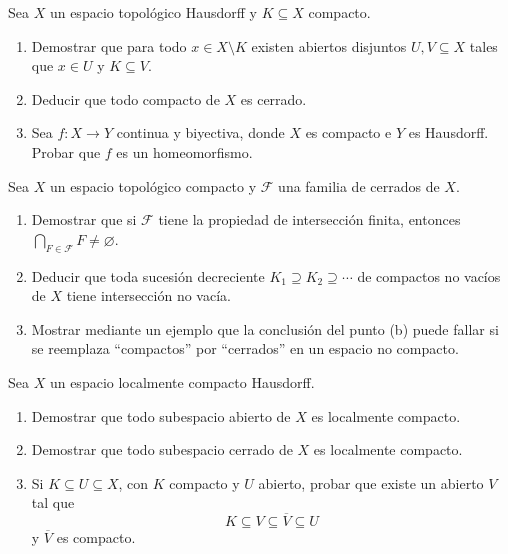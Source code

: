 \documentclass{article}
\theoremstyle{definition}
\newcommand{\cl}[1]{\overline{#1}}              %
\newenvironment{ejercicio}[1]{\begin{trivlist}
\item[\hskip \labelsep {\bfseries Ejercicio}\hskip \labelsep {\bfseries #1.}]}{\end{trivlist}}
\begin{document}
\begin{ejercicio}{15}
    Sea \(X\) un espacio topológico Hausdorff y \(K \subseteq X\) compacto.
    \begin{enumerate}
        \item Demostrar que para todo \(x \in X \setminus K\) existen abiertos disjuntos \(U, V \subseteq X\) tales que \(x \in U\) y \(K \subseteq V\).
        \item Deducir que todo compacto de \(X\) es cerrado.
        \item Sea \(f : X \to Y\) continua y biyectiva, donde \(X\) es compacto e \(Y\) es Hausdorff. Probar que \(f\) es un homeomorfismo.
    \end{enumerate}
\end{ejercicio}

\begin{ejercicio}{16}
    Sea \(X\) un espacio topológico compacto y \(\mathcal{F}\) una familia de cerrados de \(X\).
    \begin{enumerate}
        \item Demostrar que si \(\mathcal{F}\) tiene la propiedad de intersección finita, entonces \(\bigcap_{F \in \mathcal{F}} F \neq \varnothing\).
        \item Deducir que toda sucesión decreciente \(K_1 \supseteq K_2 \supseteq \cdots\) de compactos no vacíos de \(X\) tiene intersección no vacía.
        \item Mostrar mediante un ejemplo que la conclusión del punto (b) puede fallar si se reemplaza ``compactos'' por ``cerrados'' en un espacio no compacto.
    \end{enumerate}
\end{ejercicio}

\begin{ejercicio}{17}
    Sea \(X\) un espacio localmente compacto Hausdorff.
    \begin{enumerate}
        \item Demostrar que todo subespacio abierto de \(X\) es localmente compacto.
        \item Demostrar que todo subespacio cerrado de \(X\) es localmente compacto.
        \item Si \(K \subseteq U \subseteq X\), con \(K\) compacto y \(U\) abierto, probar que existe un abierto \(V\) tal que
        \[
            K \subseteq V \subseteq \cl{V} \subseteq U
        \]
        y \(\cl{V}\) es compacto.
    \end{enumerate}
\end{ejercicio}
\end{document}
